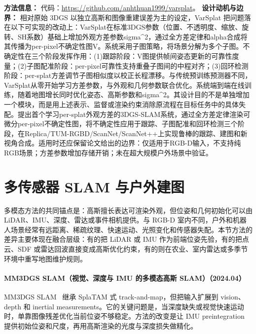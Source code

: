 \textbf{方法信息：} 代码：\url{https://github.com/anhthuan1999/varsplat}。
\textbf{设计动机与边界：} 相对原始 3DGS 以独立高斯和图像重建误差为主的设定，VarSplat 把问题落在以下可实现的改动上：VarSplat在标准3DGS参数（位置、不透明度、缩放、旋转、SH系数）基础上增加外观方差参数sigma\^{}2，通过全方差定律和alpha合成将其传播为per-pixel不确定性图V。系统采用子图策略，将场景分解为多个子图。不确定性在三个阶段发挥作用：(1)跟踪阶段：V图提供帧间姿态更新的可靠性度量；(2)子图配准阶段：per-pixel可靠性支持重叠子图间的中程对齐；(3)回环检测阶段：per-splat方差调节子图相似度以校正长程漂移。与传统预训练预测器不同，VarSplat从零开始学习方差参数，与外观和几何参数联合优化。系统端到端在线训练，随着地图增长同时优化姿态、高斯参数和sigma\^{}2。其设计目的不是单独增加一个模块，而是用上述表示、监督或渲染约束消除原流程在目标任务中的具体失配。提出首个学习per-splat外观方差的3DGS-SLAM系统，通过全方差定律渲染可微分per-pixel不确定性图，将不确定性应用于跟踪、子图配准和回环检测三个阶段，在Replica/TUM-RGBD/ScanNet/ScanNet++上实现鲁棒的跟踪、建图和新视角合成。适用时还应保留论文给出的边界：仅适用于RGB-D输入，不支持纯RGB场景；方差参数增加存储开销；未在超大规模户外场景中验证。

\section{多传感器 SLAM 与户外建图}

多模态方法的共同锚点是：高斯擅长表达可渲染外观，但位姿和几何初始化可以由 LiDAR、IMU、深度、雷达或事件相机提供。与 RGB-D 室内不同，户外和机器人场景经常有远距离、稀疏纹理、快速运动、光照变化和传感器失配。本节方法的差异主要体现在融合层级：有的把 LiDAR 或 IMU 作为前端位姿先验，有的把点云、SDF 或雷达回波直接变成高斯优化约束，有的则在农业、室内雷达或多季节环境中重写地图维护规则。
\paragraph{MM3DGS SLAM（视觉、深度与 IMU 的多模态高斯 SLAM）（2024.04）}
MM3DGS SLAM~\cite{2404_00923} 继承 SplaTAM 式 track-and-map，但把输入扩展到 vision、depth 和 inertial measurements。它的关键问题是，当深度缺失或视觉快速运动时，单靠图像残差优化当前位姿不够稳定。方法的改变是让 IMU preintegration 提供初始位姿和尺度，再用高斯渲染的光度与深度损失做精化。

